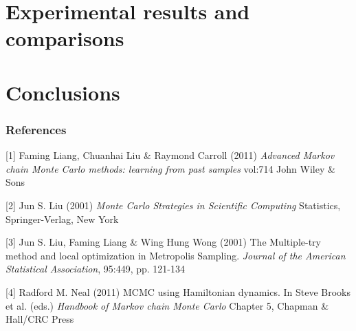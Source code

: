 \documentclass{article} %
\begin{document}
\section{Experimental results and comparisons}


\section{Conclusions}


\subsubsection*{References}


\small{
[1] Faming Liang, Chuanhai Liu \& Raymond Carroll (2011) {\it Advanced Markov chain Monte Carlo methods: learning from past samples} vol:714 John Wiley \& Sons

[2] Jun S. Liu (2001) {\it Monte Carlo Strategies in Scientific Computing} Statistics, Springer-Verlag, New York

[3] Jun S. Liu, Faming Liang \& Wing Hung Wong (2001) The Multiple-try method and local optimization in Metropolis Sampling. {\it Journal of the American Statistical Association}, 95:449, pp. 121-134

[4] Radford M. Neal (2011) MCMC using Hamiltonian dynamics. In Steve Brooks et al. (eds.) {\it Handbook of Markov chain Monte Carlo} Chapter 5, Chapman \& Hall/CRC Press
}
\end{document}
